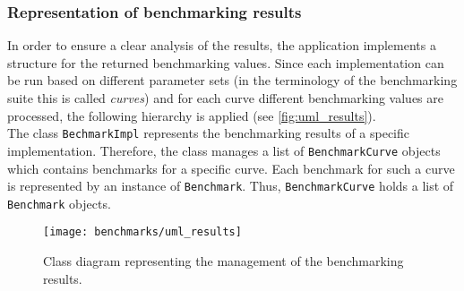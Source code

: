 \subsubsection{Representation of benchmarking results}
In order to ensure a clear analysis of the results, the application implements a structure for the returned benchmarking values. Since each implementation can be run based on different parameter sets (in the terminology of the benchmarking suite this is called \textit{curves}) and for each curve different benchmarking values are processed, the following hierarchy is applied (see \autoref{fig:uml_results}).\\
The class \texttt{BechmarkImpl} represents the benchmarking results of a specific implementation. Therefore, the class manages a list of \texttt{BenchmarkCurve} objects which contains benchmarks for a specific curve. Each benchmark for such a curve is represented by an instance of \texttt{Benchmark}. Thus, \texttt{BenchmarkCurve} holds a list of \texttt{Benchmark} objects.
\begin{figure}[H]
  \centering
  \texttt{[image: benchmarks/uml\_results]}
  \caption[Class diagram for benchmarking results.]
  {Class diagram representing the management of the benchmarking results.}\label{fig:uml_results}
\end{figure}

